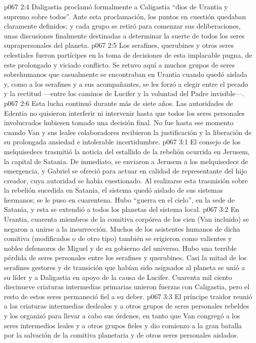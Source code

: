 \vs p067 2:4 \pc Daligastia proclamó formalmente a Caligastia “dios de Urantia y supremo sobre todos”. Ante esta proclamación, los puntos en cuestión quedaban claramente definidos; y cada grupo se retiró para comenzar sus deliberaciones, unas discusiones finalmente destinadas a determinar la suerte de todos los seres suprapersonales del planeta.
\vs p067 2:5 Los serafines, querubines y otros seres celestiales fueron partícipes en la toma de decisiones de esta implacable pugna, de este prolongado y viciado conflicto. Se retuvo aquí a muchos grupos de seres sobrehumanos que casualmente se encontraban en Urantia cuando quedó aislada y, como a los serafines y a sus acompañantes, se les forzó a elegir entre el pecado y la rectitud ---entre los caminos de Lucifer y la voluntad del Padre invisible---.
\vs p067 2:6 Esta lucha continuó durante más de siete años. Las autoridades de Edentia no quisieron interferir ni intervenir hasta que todos los seres personales involucrados hubiesen tomado una decisión final. No fue hasta ese momento cuando Van y sus leales colaboradores recibieron la justificación y la liberación de su prolongada ansiedad e intolerable incertidumbre.
\vs p067 3:1 El consejo de los melquisedecs trasmitió la noticia del estallido de la rebelión ocurrida en Jerusem, la capital de Satania. De inmediato, se enviaron a Jerusem a los melquisedecs de emergencia, y Gabriel se ofreció para actuar en calidad de representante del hijo creador, cuya autoridad se había cuestionado. Al realizarse esta trasmisión sobre la rebelión sucedida en Satania, el sistema quedó aislado de sus sistemas hermanos; se le puso en cuarentena. Hubo “guerra en el cielo”, en la sede de Satania, y esta se extendió a todos los planetas del sistema local.
\vs p067 3:2 En Urantia, cuarenta miembros de la comitiva corpórea de los cien (Van incluido) se negaron a unirse a la insurrección. Muchos de los asistentes humanos de dicha comitiva (modificados o de otro tipo) también se erigieron como valientes y nobles defensores de Miguel y de su gobierno del universo. Hubo una terrible pérdida de seres personales entre los serafines y querubines. Casi la mitad de los serafines gestores y de transición que habían sido asignados al planeta se unió a su líder y a Daligastia en apoyo de la causa de Lucifer. Cuarenta mil ciento diecinueve criaturas intermedias primarias unieron fuerzas con Caligastia, pero el resto de estos seres permaneció fiel a su deber.
\vs p067 3:3 El príncipe traidor reunió a las criaturas intermedias desleales y a otros grupos de seres personales rebeldes y los organizó para llevar a cabo sus órdenes, en tanto que Van congregó a los seres intermedios leales y a otros grupos fieles y dio comienzo a la gran batalla por la salvación de la comitiva planetaria y de otros seres personales aislados.
